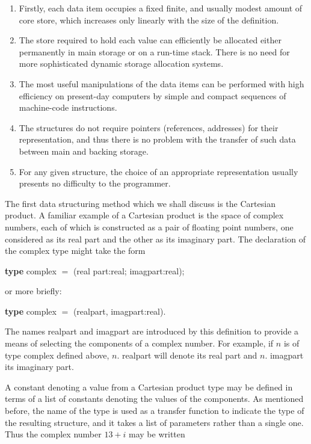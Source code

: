 \begin{enumerate}[leftmargin=2\parindent, label=(\arabic*)]
	\item Firstly, each data item occupies a fixed finite, and usually modest amount of core store, which increases only linearly with the size of the definition.

	\item The store required to hold each value can efficiently be allocated either permanently in main storage or on a run-time stack. There is no need for more sophisticated dynamic storage allocation systems.

	\item The most useful manipulations of the data items can be performed with high efficiency on present-day computers by simple and compact sequences of machine-code instructions.

	\item The structures do not require pointers (references, addresses) for their representation, and thus there is no problem with the transfer of such data between main and backing storage.

	\item For any given structure, the choice of an appropriate representation usually presents no difficulty to the programmer.
\end{enumerate}

The first data structuring method which we shall discuss is the Cartesian product. A familiar example of a Cartesian product is the space of complex numbers, each of which is constructed as a pair of floating point numbers, one considered as its real part and the other as its imaginary part. The declaration of the complex type might take the form

\quad \textbf{type} complex $=$ (real part:real; imagpart:real);
\nopagebreak

or more briefly:
\nopagebreak

\quad \textbf{type} complex $=$ (realpart, imagpart:real).

The names realpart and imagpart are introduced by this definition to provide a means of selecting the components of a complex number. For example, if $n$ is of type complex defined above, $n$. realpart will denote its real part and $n$. imagpart its imaginary part.

A constant denoting a value from a Cartesian product type may be defined in terms of a list of constants denoting the values of the components. As mentioned before, the name of the type is used as a transfer function to indicate the type of the resulting structure, and it takes a list of parameters rather than a single one. Thus the complex number $13 + i$ may be written

